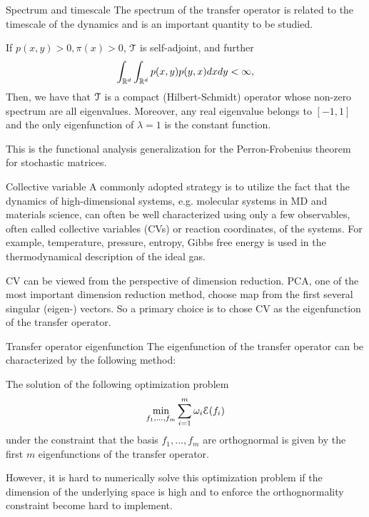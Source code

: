 \documentclass{beamer}
\begin{document}
\begin{frame}{Spectrum and timescale}
	The spectrum of the transfer operator is related to the timescale of the dynamics
	and is an important quantity to be studied.
	\begin{theorem}
		If $p(x, y) > 0, \pi(x) > 0$, $\mathcal{T}$ is self-adjoint, and further
		\begin{equation*}
			\int_{\mathbb{R}^d}\int_{\mathbb{R}^d}p(x, y)p(y, x)dxdy < \infty,
		\end{equation*}
		Then, we have that $\mathcal{T}$ is a compact (Hilbert-Schmidt) operator whose non-zero spectrum
		are all eigenvalues. Moreover, any real eigenvalue belongs to $[-1, 1]$
		and the only eigenfunction of $\lambda = 1$ is the constant function.
	\end{theorem}
	This is the functional analysis generalization for the Perron-Frobenius theorem for
	stochastic matrices.
\end{frame}

\begin{frame}{Collective variable}
	A commonly adopted strategy is to utilize the fact that the dynamics of
	high-dimensional systems, e.g. molecular systems in MD and materials science,
	can often be well characterized using only a few observables, often called
	collective variables (CVs) or reaction coordinates, of the systems. For example,
	temperature, pressure, entropy, Gibbs free energy is used in the thermodynamical
	description of the ideal gas.

	CV can be viewed from the perspective of dimension reduction. PCA, one of the most
	important dimension reduction method, choose map from the first several singular
	(eigen-) vectors. So a primary choice is to chose CV as the eigenfunction of the
	transfer operator.
\end{frame}

\begin{frame}{Transfer operator eigenfunction}
	The eigenfunction of the transfer operator can be characterized by the following method:
	\begin{theorem}
		The solution of the following optimization problem
		\begin{equation*}
			\min_{f_1, ..., f_m} \sum_{i=1}^m \omega_i \mathcal{E}(f_i)
		\end{equation*}
		under the constraint that the basis $f_1, ..., f_m$ are orthognormal is given by
		the first $m$ eigenfunctions of the transfer operator.
	\end{theorem}
	However, it is hard to numerically solve this optimization problem if the dimension
	of the underlying space is high and to enforce the orthognormality constraint become
	hard to implement.
\end{frame}
\end{document}
